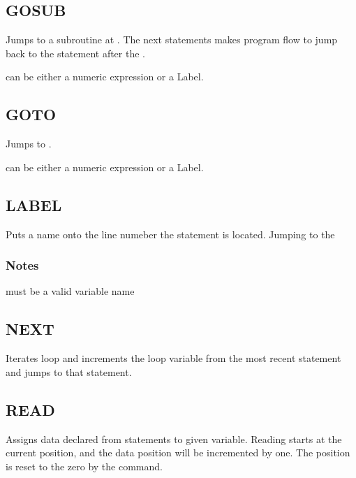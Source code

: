    \subsection{GOSUB}
        \par
        Jumps to a subroutine at . The next  statements makes program flow to jump back to the statement after the .\par
         can be either a numeric expression or a Label.
    \subsection{GOTO}
        \par
        Jumps to .\par
         can be either a numeric expression or a Label.
    \subsection{LABEL}
        \par
        Puts a name onto the line numeber the statement is located. Jumping to the 
        \subsubsection*{Notes}
        \begin{itemlist}
        \item {} must be a valid variable name
        \end{itemlist}
    \subsection{NEXT}
        \par
        Iterates  loop and increments the loop variable from the most recent  statement and jumps to that statement.
    \subsection{READ}
        \par
        Assigns data declared from  statements to given variable. Reading starts at the current  position, and the data position will be incremented by one. The position is reset to the zero by the  command.

